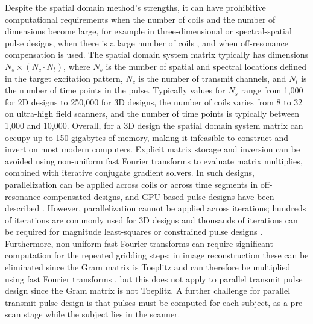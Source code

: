 \par Despite the spatial domain method's strengths, 
it can have prohibitive computational requirements when the number of coils and the number of dimensions become large, 
for example in three-dimensional \cite{malik2012tailored,davids2016fast} or spectral-spatial pulse designs, 
when there is a large number of coils \cite{orzada:2019},
and when off-resonance compensation is used.  
The spatial domain system matrix typically has dimensions $N_s \times (N_c \cdot N_t)$, 
where $N_s$ is the number of spatial and spectral locations defined in the target excitation pattern,
$N_c$ is the number of transmit channels, and $N_t$ is the number of time points in the pulse.
Typically values for $N_s$ range from 1,000 for 2D designs to 250,000 for 3D designs,
the number of coils varies from 8 to 32 on ultra-high field scanners,
and the number of time points is typically between 1,000 and 10,000. 
Overall, for a 3D design the spatial domain system matrix can occupy up to 150 gigabytes of memory,
making it infeasible to construct and invert on most modern computers.
Explicit matrix storage and inversion can be avoided using non-uniform fast Fourier transforms to evaluate matrix multiplies,
combined with iterative conjugate gradient solvers. 
In such designs, parallelization can be applied across coils or across time segments in off-resonance-compensated designs,
and GPU-based pulse designs have been described \cite{deng:2011}. 
However, parallelization cannot be applied across iterations;
hundreds of iterations are commonly used for 3D designs and thousands of iterations can be required for 
magnitude least-squares \cite{setsompop2008magnitude} 
or constrained pulse designs \cite{brunner2010optimal,hoyos:tmi:2014}. 
Furthermore, non-uniform fast Fourier transforms can require significant computation for the repeated gridding steps; 
in image reconstruction these can be eliminated since the Gram matrix is Toeplitz and can therefore be multiplied using fast Fourier transforms \cite{fessler2005toeplitz},
but this does not apply to parallel transmit pulse design since the Gram matrix is not Toeplitz. 
A further challenge for parallel transmit pulse design is that pulses must be computed for each subject,
as a pre-scan stage while the subject lies in the scanner. 

